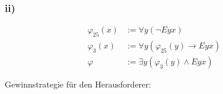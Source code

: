 \documentclass[11pt, a4paper]{article}
\newcommand{\n}{\wedge}
\begin{document}
\subsubsection*{ii)}
%
%
%

\begin{align*}
    \varphi_{25}(x) &:= \forall y (\neg Eyx ) \\
    \varphi_3(x) &:= \forall y ( \varphi_{25}(y) \rightarrow Eyx) \\
    \varphi &:= \exists y ( \varphi_3(y) \n Eyx)
\end{align*}

Gewinnstrategie für den Herausforderer: \\
\vspace*{-.5em}
\end{document}

